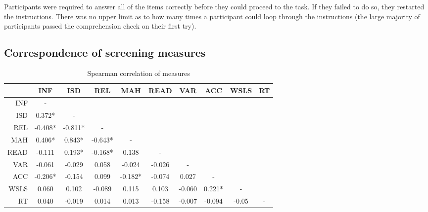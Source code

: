 \documentclass[a4paper,notitlepage,12pt]{article}
\begin{document}
Participants were required to answer all of the items correctly before they could proceed to the task. If they failed to do so, they restarted the instructions. There was no upper limit as to how many times a participant could loop through the instructions (the large majority of participants passed the comprehension check on their first try).

\subsection{Correspondence of screening measures}

\begin{table}[h!]
\centering
\begin{tabular}{rccccccccc}
\toprule
{} &      INF &      ISD &      REL &      MAH &    READ &     VAR &     ACC &   WSLS & RT \\
\midrule
INF  &        - &          &          &          &         &         &         &        &    \\
ISD  &   0.372* &        - &          &          &         &         &         &        &    \\
REL  &  -0.408* &  -0.811* &        - &          &         &         &         &        &    \\
MAH  &   0.406* &   0.843* &  -0.643* &        - &         &         &         &        &    \\
READ &   -0.111 &   0.193* &  -0.168* &    0.138 &       - &         &         &        &    \\
VAR  &   -0.061 &   -0.029 &    0.058 &   -0.024 &  -0.026 &       - &         &        &    \\
ACC  &  -0.206* &   -0.154 &    0.099 &  -0.182* &  -0.074 &   0.027 &       - &        &    \\
WSLS &    0.060 &    0.102 &   -0.089 &    0.115 &   0.103 &  -0.060 &  0.221* &      - &    \\
RT   &    0.040 &   -0.019 &    0.014 &    0.013 &  -0.158 &  -0.007 &  -0.094 &  -0.05 &  - \\
\bottomrule
\end{tabular}
\caption{Spearman correlation of measures}
\end{table}
\end{document}
